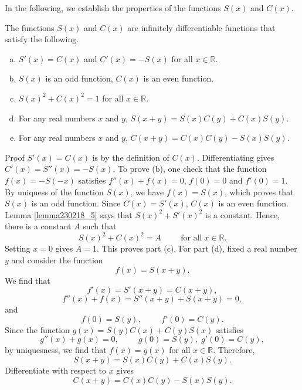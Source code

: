 In the following, we establish the properties of the functions $S(x) $ and $C(x) $.

\begin{theorem}[label=thm230218_7]{}
The functions $S(x)$ and $C(x)$ are infinitely differentiable functions that satisfy  the following.
\begin{enumerate}[(a)]
\item $S'(x)=C(x)$ and $C'(x)=-S(x)$ for all $x\in\mathbb{R}$.
\item $S(x)$ is an odd function, $C(x)$ is an even function.
\item $S(x)^2+C(x)^2=1$ for all $x\in\mathbb{R}$.
\item For any real numbers $x$ and $y$, $S(x+y)=S(x)C(y)+C(x)S(y)$.
\item  For any real numbers $x$ and $y$, $C(x+y)=C(x)C(y)-S(x)S(y)$.

\end{enumerate}
\end{theorem}
\begin{myproof}{Proof} 
$S'(x)=C(x)$ is  by the definition of $C(x)$. Differentiating gives $C'(x)=S''(x)=-S(x)$. To prove (b), one check that the function $f(x)=-S(-x)$ satisfies
$f''(x)+f(x)=0$, $f(0)=0$ and $f'(0)=1$. By uniquess of the function $S(x)$, we have $f(x)=S(x)$, which proves that $S(x)$ is an odd function. Since $C(x)=S'(x)$, $C(x)$ is an even function.
Lemma \ref{lemma230218_5} says that $S(x)^2+S'(x)^2$ is a constant. Hence, there is a constant $A$ such that
\[S(x)^2+C(x)^2=A\hspace{1cm}\text{for all}\;x\in\mathbb{R}.\]
Setting $x=0$ gives $A=1$. This proves part (c). For part (d), fixed a real number $y$ and consider the function
\[f(x)=S(x+y).\]\bp
We find that \[f'(x)=S'(x+y)=C(x+y),\]  
\[f''(x)+f(x)=S''(x+y)+S(x+y)=0,\]
and
\[f(0)=S(y),\hspace{1cm}f'(0)=C(y).\]
Since the function $g(x)=S(y)C(x)+C(y)S(x)$  satisfies
\[g''(x)+g(x)=0,\hspace{1cm}g(0)=S(y),\;g'(0)=C(y),\]
by uniquesness, we find that $f(x)=g(x)$ for all $x\in \mathbb{R}$. Therefore,
\[S(x+y)=S(x)C(y)+C(x)S(y).\]
Differentiate with respect to $x$ gives
\[C(x+y)=C(x)C(y)-S(x)S(y).\]
\end{myproof}

